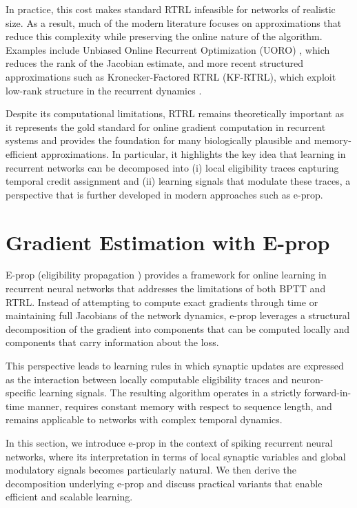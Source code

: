 In practice, this cost makes standard RTRL infeasible for networks of realistic size. As a result, much of the modern literature focuses on approximations that reduce this complexity while preserving the online nature of the algorithm. Examples include Unbiased Online Recurrent Optimization (UORO) \citep{UORO}, which reduces the rank of the Jacobian estimate, and more recent structured approximations such as Kronecker-Factored RTRL (KF-RTRL), which exploit low-rank structure in the recurrent dynamics \citep{eprop2020}.

Despite its computational limitations, RTRL remains theoretically important as it represents the gold standard for online gradient computation in recurrent systems and provides the foundation for many biologically plausible and memory-efficient approximations. In particular, it highlights the key idea that learning in recurrent networks can be decomposed into (i) local eligibility traces capturing temporal credit assignment and (ii) learning signals that modulate these traces, a perspective that is further developed in modern approaches such as e-prop.

\section{Gradient Estimation with E-prop}
\label{sec:e-prop}
E-prop (eligibility propagation  \cite{eprop2020}) provides a framework for online learning in recurrent neural networks that addresses the limitations of both BPTT and RTRL. Instead of attempting to compute exact gradients through time or maintaining full Jacobians of the network dynamics, e-prop leverages a structural decomposition of the gradient into components that can be computed locally and components that carry information about the loss.

This perspective leads to learning rules in which synaptic updates are expressed as the interaction between locally computable eligibility traces and neuron-specific learning signals. The resulting algorithm operates in a strictly forward-in-time manner, requires constant memory with respect to sequence length, and remains applicable to networks with complex temporal dynamics.

In this section, we introduce e-prop in the context of spiking recurrent neural networks, where its interpretation in terms of local synaptic variables and global modulatory signals becomes particularly natural. We then derive the decomposition underlying e-prop and discuss practical variants that enable efficient and scalable learning.

